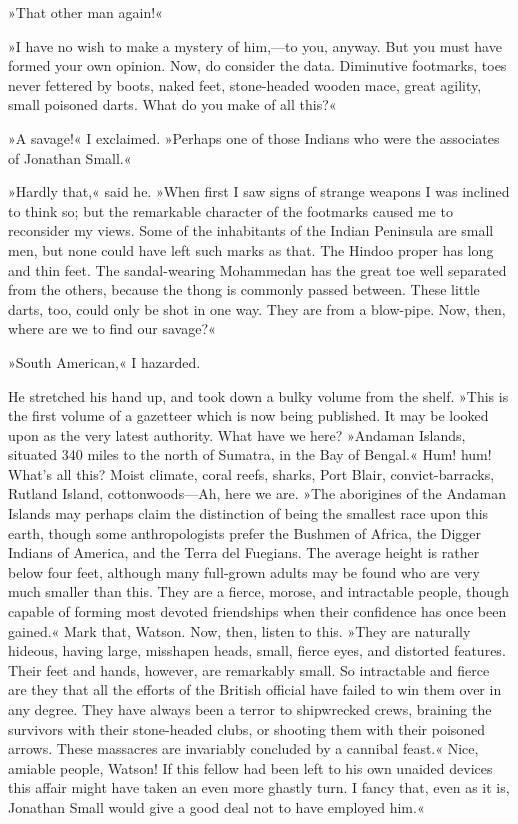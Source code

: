 »That other man again!«

»I have no wish to make a mystery of him,—to you, anyway. But you must have formed your own opinion. Now, do consider the data. Diminutive footmarks, toes never fettered by boots, naked feet, stone-headed wooden mace, great agility, small poisoned darts. What do you make of all this?«

»A savage!« I exclaimed. »Perhaps one of those Indians who were the associates of Jonathan Small.«

»Hardly that,« said he. »When first I saw signs of strange weapons I was inclined to think so; but the remarkable character of the footmarks caused me to reconsider my views. Some of the inhabitants of the Indian Peninsula are small men, but none could have left such marks as that. The Hindoo proper has long and thin feet. The sandal-wearing Mohammedan has the great toe well separated from the others, because the thong is commonly passed between. These little darts, too, could only be shot in one way. They are from a blow-pipe. Now, then, where are we to find our savage?«

»South American,« I hazarded.

He stretched his hand up, and took down a bulky volume from the shelf. »This is the first volume of a gazetteer which is now being published. It may be looked upon as the very latest authority. What have we here? »Andaman Islands, situated 340 miles to the north of Sumatra, in the Bay of Bengal.« Hum! hum! What's all this? Moist climate, coral reefs, sharks, Port Blair, convict-barracks, Rutland Island, cottonwoods—Ah, here we are. »The aborigines of the Andaman Islands may perhaps claim the distinction of being the smallest race upon this earth, though some anthropologists prefer the Bushmen of Africa, the Digger Indians of America, and the Terra del Fuegians. The average height is rather below four feet, although many full-grown adults may be found who are very much smaller than this. They are a fierce, morose, and intractable people, though capable of forming most devoted friendships when their confidence has once been gained.« Mark that, Watson. Now, then, listen to this. »They are naturally hideous, having large, misshapen heads, small, fierce eyes, and distorted features. Their feet and hands, however, are remarkably small. So intractable and fierce are they that all the efforts of the British official have failed to win them over in any degree. They have always been a terror to shipwrecked crews, braining the survivors with their stone-headed clubs, or shooting them with their poisoned arrows. These massacres are invariably concluded by a cannibal feast.« Nice, amiable people, Watson! If this fellow had been left to his own unaided devices this affair might have taken an even more ghastly turn. I fancy that, even as it is, Jonathan Small would give a good deal not to have employed him.«

